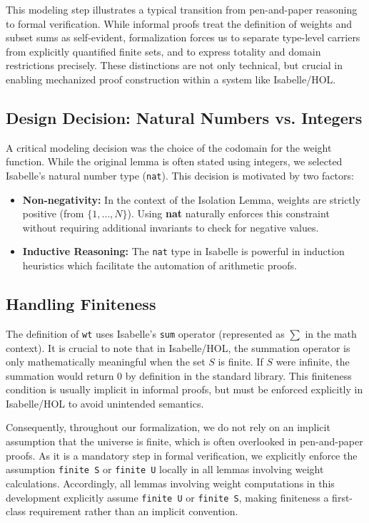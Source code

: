 This modeling step illustrates a typical transition from pen-and-paper reasoning to formal verification.
While informal proofs treat the definition of weights and subset sums as self-evident, formalization forces us to separate type-level carriers from explicitly quantified finite sets, and to express totality and domain restrictions precisely.
These distinctions are not only technical, but crucial in enabling mechanized proof construction within a system like Isabelle/HOL.

\subsection*{Design Decision: Natural Numbers vs. Integers}
A critical modeling decision was the choice of the codomain for the weight function.
While the original lemma is often stated using integers, we selected Isabelle's natural number type (\texttt{nat}).
This decision is motivated by two factors:

\begin{itemize}
    \item \textbf{Non-negativity:} In the context of the Isolation Lemma, weights are strictly positive (from $\{1, \dots, N\}$).
        Using \textbf{nat} naturally enforces this constraint without requiring additional invariants to check for negative values.
    \item \textbf{Inductive Reasoning:} The \texttt{nat} type in Isabelle is powerful in induction heuristics which facilitate the automation of arithmetic proofs.
\end{itemize}

\subsection*{Handling Finiteness}
The definition of \texttt{wt} uses Isabelle's \texttt{sum} operator (represented as $\sum$ in the math context).
It is crucial to note that in Isabelle/HOL, the summation operator is only mathematically meaningful when the set $S$ is finite.
If $S$ were infinite, the summation would return 0 by definition in the standard library.
This finiteness condition is usually implicit in informal proofs, but must be enforced explicitly in Isabelle/HOL to avoid unintended semantics.

Consequently, throughout our formalization, we do not rely on an implicit assumption that the universe is finite, which is often overlooked in pen-and-paper proofs.
As it is a mandatory step in formal verification, we explicitly enforce the assumption \texttt{finite S} or \texttt{finite U} locally in all lemmas involving weight calculations.
Accordingly, all lemmas involving weight computations in this development explicitly assume \texttt{finite U} or \texttt{finite S}, making finiteness a first-class requirement rather than an implicit convention.



